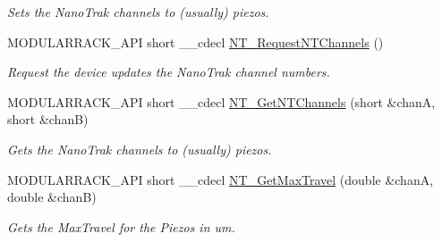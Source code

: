 \begin{DoxyCompactItemize}
\begin{DoxyCompactList}\small\item\em Sets the Nano\+Trak channels to (usually) piezos. \end{DoxyCompactList}\item 
M\+O\+D\+U\+L\+A\+R\+R\+A\+C\+K\+\_\+\+A\+PI short \+\_\+\+\_\+cdecl \hyperlink{group___modular_nano_trak_ga0f1144ad0b6706edf4365a66c6e4f43d}{N\+T\+\_\+\+Request\+N\+T\+Channels} ()
\begin{DoxyCompactList}\small\item\em Request the device updates the Nano\+Trak channel numbers. \end{DoxyCompactList}\item 
M\+O\+D\+U\+L\+A\+R\+R\+A\+C\+K\+\_\+\+A\+PI short \+\_\+\+\_\+cdecl \hyperlink{group___modular_nano_trak_ga762cf8eeccc970fa41387123e647a548}{N\+T\+\_\+\+Get\+N\+T\+Channels} (short \&chanA, short \&chanB)
\begin{DoxyCompactList}\small\item\em Gets the Nano\+Trak channels to (usually) piezos. \end{DoxyCompactList}\item 
M\+O\+D\+U\+L\+A\+R\+R\+A\+C\+K\+\_\+\+A\+PI short \+\_\+\+\_\+cdecl \hyperlink{group___modular_nano_trak_ga847f7f7d03de8d141a9082c4ee6cc635}{N\+T\+\_\+\+Get\+Max\+Travel} (double \&chanA, double \&chanB)
\begin{DoxyCompactList}\small\item\em Gets the Max\+Travel for the Piezos in um. \end{DoxyCompactList}\end{DoxyCompactItemize}


